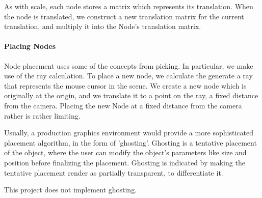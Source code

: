 \documentclass[11pt,draft]{article}
\begin{document}
As with scale, each node stores a matrix which represents its translation. When the node is translated, we construct a new translation matrix for the
current translation, and multiply it into the Node's translation matrix.

\paragraph{Placing Nodes}
Node placement uses some of the concepts from picking. In particular, we make use of the ray calculation.
To place a new node, we calculate the generate a ray that represents the mouse cursor in the scene.
We create a new node which is originally at the origin, and we translate it to a point on the ray, a fixed distance from the camera.
Placing the new Node at a fixed distance from the camera rather is rather limiting.

Usually, a production graphics environment would provide a more sophisticated placement algorithm, in the form of 'ghosting'. Ghosting is a tentative
placement of the object, where the user can modify the object's parameters like size and position before finalizing the placement. Ghosting is indicated
by making the tentative placement render as partially transparent, to differentiate it.

This project does not implement ghosting.
\end{document}
